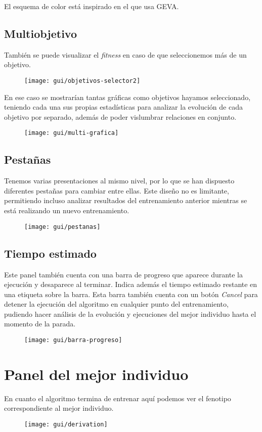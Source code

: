 El esquema de color está inspirado en el que usa GEVA\cite{gevaGit}.

\subsection{Multiobjetivo}
También se puede visualizar el \textit{fitness} en caso de que seleccionemos más de un objetivo.
\begin{figure}[H]
\centering
\texttt{[image: gui/objetivos-selector2]}
\end{figure}

En ese caso se mostrarían tantas gráficas como objetivos hayamos seleccionado, teniendo cada una sus propias estadísticas para analizar la evolución de cada objetivo por separado, además de poder vislumbrar relaciones en conjunto.
\begin{figure}[H]
\centering
\texttt{[image: gui/multi-grafica]}
\end{figure}

\subsection{Pestañas}
Tenemos varias presentaciones al mismo nivel, por lo que se han dispuesto diferentes pestañas para cambiar entre ellas. Este diseño no es limitante, permitiendo incluso analizar resultados del entrenamiento anterior mientras se está realizando un nuevo entrenamiento.
\begin{figure}[H]
\centering
\texttt{[image: gui/pestanas]}
\end{figure}

\subsection{Tiempo estimado}
Este panel también cuenta con una barra de progreso que aparece durante la ejecución y desaparece al terminar. Indica además el tiempo estimado restante en una etiqueta sobre la barra. Esta barra también cuenta con un botón \textit{Cancel} para detener la ejecución del algoritmo en cualquier punto del entrenamiento, pudiendo hacer análisis de la evolución y ejecuciones del mejor individuo hasta el momento de la parada.
\begin{figure}[H]
\centering
\texttt{[image: gui/barra-progreso]}
\end{figure}

\section{Panel del mejor individuo}
En cuanto el algoritmo termina de entrenar aquí podemos ver el fenotipo correspondiente al mejor individuo.
\begin{figure}[H]
\centering
\texttt{[image: gui/derivation]}
\end{figure}

